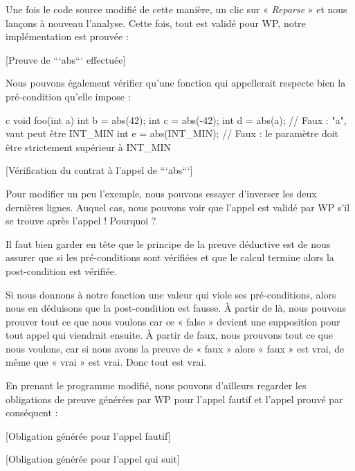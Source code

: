 \documentclass[middle]{zmdocument}
\begin{document}
Une fois le code source modifié de cette manière, un clic sur « \textit{Reparse} » et 
nous lançons à nouveau l'analyse. Cette fois, tout est validé pour WP, notre 
implémentation est prouvée :



[Preuve de ```abs``` effectuée]


Nous pouvons également vérifier qu'une fonction qui appellerait  
respecte bien la pré-condition qu'elle impose :



\begin{CodeBlock}{c}
void foo(int a){
   int b = abs(42);
   int c = abs(-42);
   int d = abs(a);       // Faux : "a", vaut peut être INT_MIN
   int e = abs(INT_MIN); // Faux : le paramètre doit être strictement supérieur à INT_MIN
}
\end{CodeBlock}



[Vérification du contrat à l'appel de ```abs```]


Pour modifier un peu l'exemple, nous pouvons essayer d'inverser les deux 
dernières lignes. Auquel cas, nous pouvons voir que l'appel 
est validé par WP s'il se trouve après l'appel  ! 
Pourquoi ?



Il faut bien garder en tête que le principe de la preuve déductive est de nous
assurer que si les pré-conditions sont vérifiées et que le calcul termine alors
la post-condition est vérifiée.



Si nous donnons à notre fonction une valeur qui viole ses pré-conditions, alors
nous en déduisons que la post-condition est fausse. À partir de là, nous pouvons 
prouver tout ce que nous voulons car ce « false » devient une supposition pour
tout appel qui viendrait ensuite. À partir de faux, nous prouvons tout ce que 
nous voulons, car si nous avons la preuve de « faux » alors « faux » est vrai, de 
même que « vrai » est vrai. Donc tout est vrai.



En prenant le programme modifié, nous pouvons d'ailleurs regarder les obligations
de preuve générées par WP pour l'appel fautif et l'appel prouvé par conséquent :



[Obligation générée pour l'appel fautif]


[Obligation générée pour l'appel qui suit]
\end{document}
